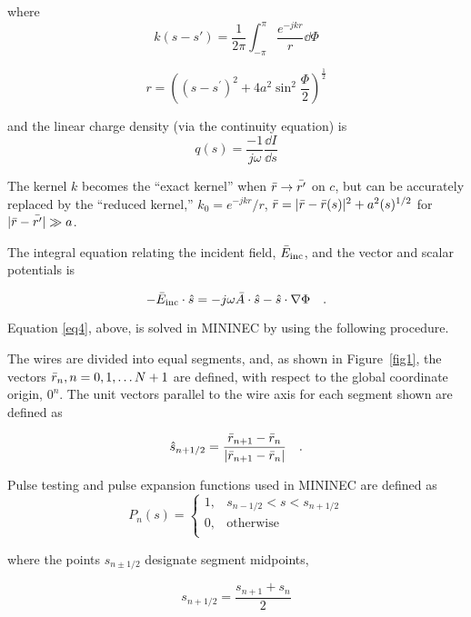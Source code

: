 \documentclass[12pt]{article}
\begin{document}
where
\[ k(s-s\prime) = \frac{1}{2\pi}\int_{-\pi}^{\pi} \frac{e^{-jkr}}{r}\dd{\Phi}
\]

\[ r = \left((s-s^\prime)^2 + 4a^2\sin^2\frac{\Phi}{2}\right)^{\frac{1}{2}}
\]

and the linear charge density (via the continuity equation) is
\begin{equation}
q(s) = \frac{-1}{j\omega}\frac{\dd{I}}{\dd{s}}
\label{eq3}
\end{equation}

The kernel $k$ becomes the ``exact kernel'' when
$\bar{r}\rightarrow\bar{r^\prime}$ on $c$, but can be accurately
replaced by the ``reduced kernel,''
$k_0 = e^{-jkr}/r$, $\bar{r}=|\bar{r} - \bar{r}(s)|^2+a^2(s)^{1/2}$
for $|\bar{r}-\bar{r^\prime}| \gg a$.

The integral equation relating the incident field, $\bar{E}_{\mathrm{inc}}$, and the
vector and scalar potentials is

\begin{equation}
-\bar{E}_{\mathrm{inc}}\cdot\hat{s}=
-j\omega\bar{A}\cdot\hat{s}-\hat{s}\cdot\nabla\Phi
\quad .
\label{eq4}
\end{equation}

Equation \eqref{eq4}, above, is solved in MININEC by using the following
procedure.

The wires are divided into equal segments, and, as shown in
Figure~\ref{fig1}, the vectors $\bar{r}_n, n=0, 1, \ldots N+1$ are
defined, with respect to the global coordinate origin, $0^n$. The unit
vectors parallel to the wire axis for each segment shown are defined as

\begin{equation}
\hat{s}_{n+1/2} = \frac{\bar{r}_{n+1}
- \bar{r}_n}{|\bar{r}_{n+1}-\bar{r}_n|}
\quad .
\label{eq5}
\end{equation}

Pulse testing and pulse expansion functions used in MININEC are defined as
\begin{equation}
P_n(s) = \left\{
\begin{array}{ll}
1, & s_{n-1/2} < s < s_{n+1/2} \\
0, & \mathrm{otherwise}        \\
\end{array}\right.
\label{eq6}
\end{equation}

\noindent where the points $s_{n\pm1/2}$ designate segment midpoints,

\begin{equation}
s_{n+1/2} = \frac{s_{n+1} + s_n}{2}
\label{eq7}
\end{equation}
\end{document}
